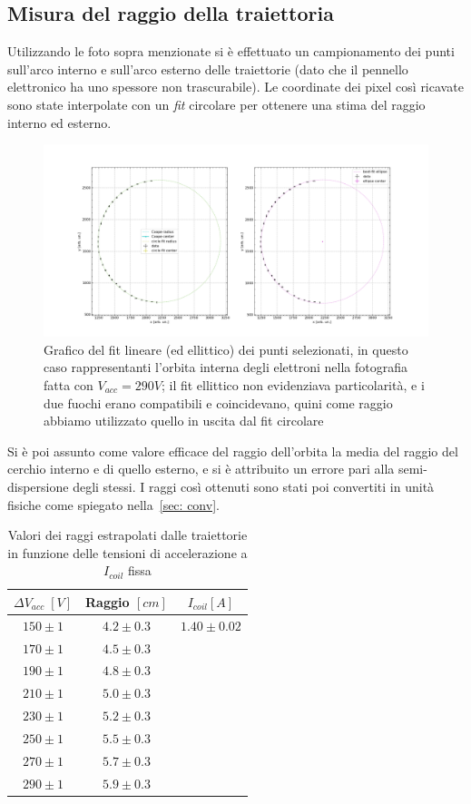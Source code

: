 \documentclass[10pt, a4paper, italian]{article}
\begin{document}
\subsection{Misura del raggio della traiettoria}
Utilizzando le foto sopra menzionate si è effettuato un campionamento dei punti
sull'arco interno e sull'arco esterno delle traiettorie (dato che il pennello elettronico ha uno spessore non trascurabile). Le coordinate dei pixel così ricavate
sono state interpolate con un \emph{fit} circolare per ottenere una stima del
raggio interno ed esterno.
\begin{figure}
\includegraphics[width=\textwidth]{circfit}
\caption{Grafico del fit lineare (ed ellittico) dei punti selezionati, in questo caso rappresentanti l'orbita interna degli elettroni nella fotografia fatta con $V_{acc}=290 V$; il fit ellittico non evidenziava particolarità, e i due fuochi erano compatibili e coincidevano, quini come raggio abbiamo utilizzato quello in uscita dal fit circolare}
\end{figure}
Si è poi assunto come valore efficace del raggio
dell'orbita la media del raggio del cerchio interno e di quello esterno,
e si è attribuito un errore pari alla semi-dispersione degli stessi.
I raggi così ottenuti sono stati poi convertiti in unità fisiche come spiegato
nella~\cref{sec: conv}. \\
\begin{table}[htbp]
\centering
\begin{tabular}{cc|c}
\toprule
$\Delta V_{acc} \; [\si{V}]$ & Raggio $[\si{cm}]$ & $I_{coil} [A]$ \\
\midrule

$150 \pm 1$ & $4.2 \pm 0.3$ & $1.40 \pm 0.02$\\
$170 \pm 1$ & $4.5 \pm 0.3$ & \\
$190 \pm 1$ & $4.8 \pm 0.3$ & \\
$210 \pm 1$ & $5.0 \pm 0.3$ & \\
$230 \pm 1$ & $5.2 \pm 0.3$ & \\
$250 \pm 1$ & $5.5 \pm 0.3$ & \\
$270 \pm 1$ & $5.7 \pm 0.3$ & \\
$290 \pm 1$ & $5.9 \pm 0.3$ & \\
\bottomrule
\end{tabular}
\caption{Valori dei raggi estrapolati dalle traiettorie in funzione delle tensioni di accelerazione a $I_{coil}$ fissa}
\end{table}
\end{document}
